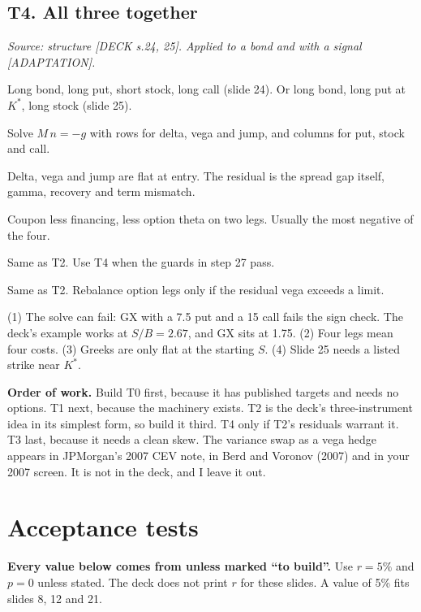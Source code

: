 \documentclass[10pt,a4paper]{article}
\newcommand{\DECK}[1]{\textsf{\footnotesize\textcolor{tagdeck}{[DECK s.#1]}}}
\newcommand{\ADAPT}{\textsf{\footnotesize\textcolor{tagadapt}{[ADAPTATION]}}}
\begin{document}
\subsection*{T4. All three together}
\textit{Source: structure \DECK{24, 25}. Applied to a bond and with a signal \ADAPT.}
\begin{description}[style=sameline,leftmargin=1.9cm,labelwidth=1.7cm,labelsep=0.2cm,itemsep=1pt,parsep=0pt,font=\bfseries]
\item[Legs] Long bond, long put, short stock, long call (slide 24). Or long bond, long put at $K^*$, long stock (slide 25).
\item[Size] Solve $M\,n=-g$ with rows for delta, vega and jump, and columns for put, stock and call.
\item[Hedge] Delta, vega and jump are flat at entry. The residual is the spread gap itself, gamma, recovery and term mismatch.
\item[Carry] Coupon less financing, less option theta on two legs. Usually the most negative of the four.
\item[Signal] Same as T2. Use T4 when the guards in step 27 pass.
\item[Exit] Same as T2. Rebalance option legs only if the residual vega exceeds a limit.
\item[Goes wrong] (1) The solve can fail: GX with a 7.5 put and a 15 call fails the sign check. The deck's example works at $S/B=2.67$, and GX sits at 1.75. (2) Four legs mean four costs. (3) Greeks are only flat at the starting $S$. (4) Slide 25 needs a listed strike near $K^*$.
\end{description}

\textbf{Order of work.} Build T0 first, because it has published targets and needs no options. T1 next, because the machinery exists. T2 is the deck's three-instrument idea in its simplest form, so build it third. T4 only if T2's residuals warrant it. T3 last, because it needs a clean skew. The variance swap as a vega hedge appears in JPMorgan's 2007 CEV note, in Berd and Voronov (2007) and in your 2007 screen. It is not in the deck, and I leave it out.

\section{Acceptance tests}\label{sec:tests}

\textbf{Every value below comes from  unless marked ``to build''.} Use $r=5\%$ and $p=0$ unless stated. The deck does not print $r$ for these slides. A value of 5\% fits slides 8, 12 and 21.
\end{document}

